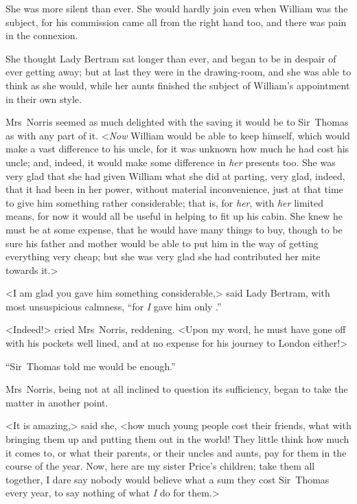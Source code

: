 She was more silent than ever. She would hardly join even when William was the subject, for his commission came all from the right hand too, and there was pain in the connexion.

She thought Lady Bertram sat longer than ever, and began to be in despair of ever getting away; but at last they were in the drawing-room, and she was able to think as she would, while her aunts finished the subject of William's appointment in their own style.

Mrs~Norris seemed as much delighted with the saving it would be to Sir~Thomas as with any part of it. <\textit{Now}  William would be able to keep himself, which would make a vast difference to his uncle, for it was unknown how much he had cost his uncle; and, indeed, it would make some difference in \textit{her}  presents too. She was very glad that she had given William what she did at parting, very glad, indeed, that it had been in her power, without material inconvenience, just at that time to give him something rather considerable; that is, for \textit{her}, with \textit{her}  limited means, for now it would all be useful in helping to fit up his cabin. She knew he must be at some expense, that he would have many things to buy, though to be sure his father and mother would be able to put him in the way of getting everything very cheap; but she was very glad she had contributed her mite towards it.>

<I am glad you gave him something considerable,> said Lady Bertram, with most unsuspicious calmness, “for \textit{I}  gave him only .”

<Indeed!> cried Mrs~Norris, reddening. <Upon my word, he must have gone off with his pockets well lined, and at no expense for his journey to London either!>

“Sir~Thomas told me  would be enough.”

Mrs~Norris, being not at all inclined to question its sufficiency, began to take the matter in another point.

<It is amazing,> said she, <how much young people cost their friends, what with bringing them up and putting them out in the world! They little think how much it comes to, or what their parents, or their uncles and aunts, pay for them in the course of the year. Now, here are my sister Price's children; take them all together, I dare say nobody would believe what a sum they cost Sir~Thomas every year, to say nothing of what \textit{I}  do for them.>

